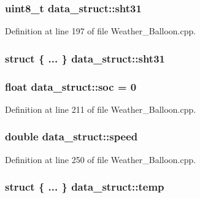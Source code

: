 \subsubsection[{\texorpdfstring{sht31}{sht31}}]{\setlength{\rightskip}{0pt plus 5cm}uint8\+\_\+t data\+\_\+struct\+::sht31}\hypertarget{structdata__struct_af5a30f8e65d752c36b2f36dd5a686f27}{}\label{structdata__struct_af5a30f8e65d752c36b2f36dd5a686f27}


Definition at line 197 of file Weather\+\_\+\+Balloon.\+cpp.

\subsubsection[{\texorpdfstring{sht31}{sht31}}]{\setlength{\rightskip}{0pt plus 5cm}struct \{ ... \}   data\+\_\+struct\+::sht31}\hypertarget{structdata__struct_a97c2e1e9042cd4bb3125779e96e1852a}{}\label{structdata__struct_a97c2e1e9042cd4bb3125779e96e1852a}
\subsubsection[{\texorpdfstring{soc}{soc}}]{\setlength{\rightskip}{0pt plus 5cm}float data\+\_\+struct\+::soc = 0}\hypertarget{structdata__struct_a3accfbed388d6da43a648bd29a79c7fb}{}\label{structdata__struct_a3accfbed388d6da43a648bd29a79c7fb}


Definition at line 211 of file Weather\+\_\+\+Balloon.\+cpp.

\subsubsection[{\texorpdfstring{speed}{speed}}]{\setlength{\rightskip}{0pt plus 5cm}double data\+\_\+struct\+::speed}\hypertarget{structdata__struct_a2700ca8b5bcfe642e6fdfb2024037636}{}\label{structdata__struct_a2700ca8b5bcfe642e6fdfb2024037636}


Definition at line 250 of file Weather\+\_\+\+Balloon.\+cpp.

\subsubsection[{\texorpdfstring{temp}{temp}}]{\setlength{\rightskip}{0pt plus 5cm}struct \{ ... \}   data\+\_\+struct\+::temp}\hypertarget{structdata__struct_ab2ecd8eb6a960f8c8ee0faa0812d0db3}{}\label{structdata__struct_ab2ecd8eb6a960f8c8ee0faa0812d0db3}

